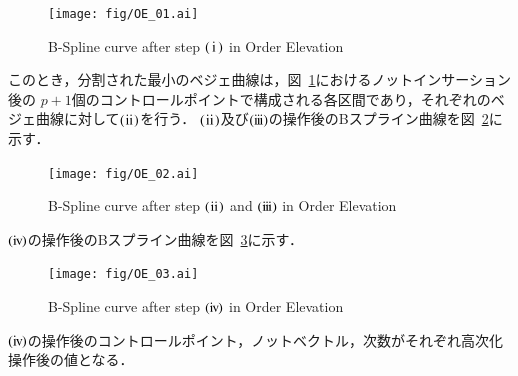 \begin{figure}[htbp]
  \centering
  \texttt{[image: fig/OE\_01.ai]}
  \caption{B-Spline curve after step $\rm(\hspace{.18em}i\hspace{.18em})$ in Order Elevation}
  \label{fig:OE_01}
\end{figure}

\noindent
このとき，分割された最小のベジェ曲線は，図~\ref{fig:OE_01}におけるノットインサーション後の
$p+1$個のコントロールポイントで構成される各区間であり，それぞれのベジェ曲線に対して$\rm(\hspace{.08em}ii\hspace{.08em})$を行う．
$\rm(\hspace{.08em}ii\hspace{.08em})$及び$\rm(i\hspace{-.08em}i\hspace{-.08em}i)$の操作後のBスプライン曲線を図~\ref{fig:OE_02}に示す．

\begin{figure}[htbp]
  \centering
  \texttt{[image: fig/OE\_02.ai]}
  \caption{B-Spline curve after step $\rm(\hspace{.08em}ii\hspace{.08em})$ and $\rm(i\hspace{-.08em}i\hspace{-.08em}i)$ in Order Elevation}
  \label{fig:OE_02}
\end{figure}

\newpage

\noindent
$\rm(i\hspace{-.08em}v\hspace{-.06em})$の操作後のBスプライン曲線を図~\ref{fig:OE_03}に示す．

\begin{figure}[htbp]
  \centering
  \texttt{[image: fig/OE\_03.ai]}
  \caption{B-Spline curve after step $\rm(i\hspace{-.08em}v\hspace{-.06em})$ in Order Elevation}
  \label{fig:OE_03}
\end{figure}

\noindent
$\rm(i\hspace{-.08em}v\hspace{-.06em})$の操作後のコントロールポイント，ノットベクトル，次数がそれぞれ高次化操作後の値となる．

